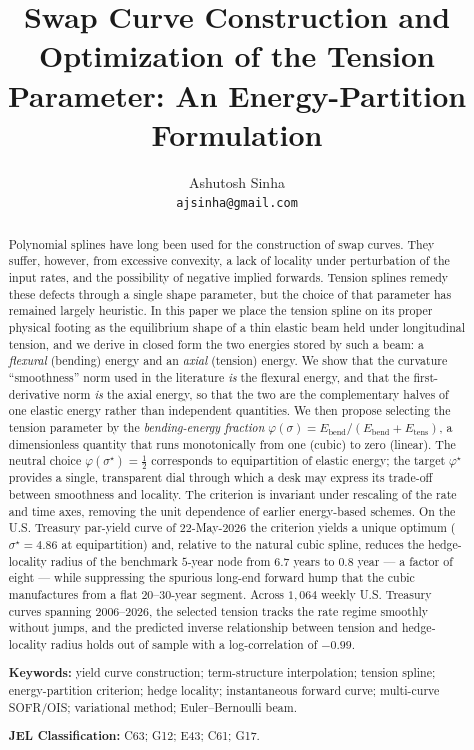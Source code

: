 \documentclass[10pt]{article}
\title{\vspace{-1.2cm}\Large\bfseries Swap Curve Construction and Optimization of the
Tension Parameter: An Energy-Partition Formulation}
\author{Ashutosh Sinha\\
\small\texttt{ajsinha@gmail.com}}
\date{}
\begin{document}
\maketitle
\thispagestyle{fancy}

\begin{abstract}
\noindent Polynomial splines have long been used for the construction of swap curves. They
suffer, however, from excessive convexity, a lack of locality under perturbation of the
input rates, and the possibility of negative implied forwards. Tension splines remedy these
defects through a single shape parameter, but the choice of that parameter has remained
largely heuristic. In this paper we place the tension spline on its proper physical footing
as the equilibrium shape of a thin elastic beam held under longitudinal tension, and we
derive in closed form the two energies stored by such a beam: a \emph{flexural} (bending)
energy and an \emph{axial} (tension) energy. We show that the curvature ``smoothness'' norm
used in the literature \emph{is} the flexural energy, and that the first-derivative norm
\emph{is} the axial energy, so that the two are the complementary halves of one elastic
energy rather than independent quantities. We then propose selecting the tension parameter
by the \emph{bending-energy fraction}
$\varphi(\sigma)=E_{\mathrm{bend}}/(E_{\mathrm{bend}}+E_{\mathrm{tens}})$, a dimensionless
quantity that runs monotonically from one (cubic) to zero (linear). The neutral choice
$\varphi(\sigma^\star)=\tfrac12$ corresponds to equipartition of elastic energy; the target
$\varphi^\star$ provides a single, transparent dial through which a desk may express its
trade-off between smoothness and locality. The criterion is invariant under rescaling of the
rate and time axes, removing the unit dependence of earlier energy-based schemes. On the U.S.
Treasury par-yield curve of $22$-May-$2026$ the criterion yields a unique optimum
($\sigma^\star=4.86$ at equipartition) and, relative to the natural cubic spline, reduces the
hedge-locality radius of the benchmark $5$-year node from $6.7$ years to $0.8$ year --- a
factor of eight --- while suppressing the spurious long-end forward hump that the cubic
manufactures from a flat $20$--$30$-year segment. Across $1{,}064$ weekly U.S. Treasury curves
spanning 2006--2026, the selected tension tracks the rate regime smoothly without jumps, and the
predicted inverse relationship between tension and hedge-locality radius holds out of sample with
a log-correlation of $-0.99$.

\medskip
\noindent\textbf{Keywords:} yield curve construction; term-structure interpolation; tension
spline; energy-partition criterion; hedge locality; instantaneous forward curve; multi-curve
SOFR/OIS; variational method; Euler--Bernoulli beam.

\smallskip
\noindent\textbf{JEL Classification:} C63; G12; E43; C61; G17.
\end{abstract}
\end{document}
